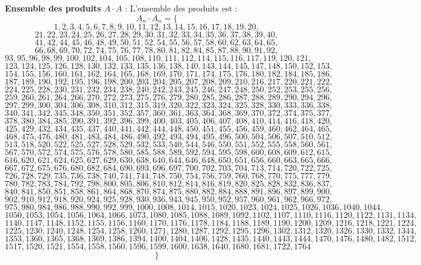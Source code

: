 \documentclass[11pt,a4paper]{article}
\begin{document}
\textbf{Ensemble des produits $A \cdot A$} :
L'ensemble des produits est :
$$ A_{{{n}}} \cdot A_{{{n}}} = \{ $$$$ 1, 2, 3, 4, 5, 6, 7, 8, 9, 10, 11, 12, 13, 14, 15, 16, 17, 18, 19, 20, $$$$ 21, 22, 23, 24, 25, 26, 27, 28, 29, 30, 31, 32, 33, 34, 35, 36, 37, 38, 39, 40, $$$$ 41, 42, 44, 45, 46, 48, 49, 50, 51, 52, 54, 55, 56, 57, 58, 60, 62, 63, 64, 65, $$$$ 66, 68, 69, 70, 72, 74, 75, 76, 77, 78, 80, 81, 82, 84, 85, 87, 88, 90, 91, 92, $$$$ 93, 95, 96, 98, 99, 100, 102, 104, 105, 108, 110, 111, 112, 114, 115, 116, 117, 119, 120, 121, $$$$ 123, 124, 125, 126, 128, 130, 132, 133, 135, 136, 138, 140, 143, 144, 145, 147, 148, 150, 152, 153, $$$$ 154, 155, 156, 160, 161, 162, 164, 165, 168, 169, 170, 171, 174, 175, 176, 180, 182, 184, 185, 186, $$$$ 187, 189, 190, 192, 195, 196, 198, 200, 203, 204, 205, 207, 208, 209, 210, 216, 217, 220, 221, 222, $$$$ 224, 225, 228, 230, 231, 232, 234, 238, 240, 242, 243, 245, 246, 247, 248, 250, 252, 253, 255, 256, $$$$ 259, 260, 261, 264, 266, 270, 272, 273, 275, 276, 279, 280, 285, 286, 287, 288, 289, 290, 294, 296, $$$$ 297, 299, 300, 304, 306, 308, 310, 312, 315, 319, 320, 322, 323, 324, 325, 328, 330, 333, 336, 338, $$$$ 340, 341, 342, 345, 348, 350, 351, 352, 357, 360, 361, 363, 364, 368, 369, 370, 372, 374, 375, 377, $$$$ 378, 380, 384, 385, 390, 391, 392, 396, 399, 400, 403, 405, 406, 407, 408, 410, 414, 416, 418, 420, $$$$ 425, 429, 432, 434, 435, 437, 440, 441, 442, 444, 448, 450, 451, 455, 456, 459, 460, 462, 464, 465, $$$$ 468, 475, 476, 480, 481, 483, 484, 486, 490, 492, 493, 494, 495, 496, 500, 504, 506, 507, 510, 512, $$$$ 513, 518, 520, 522, 525, 527, 528, 529, 532, 533, 540, 544, 546, 550, 551, 552, 555, 558, 560, 561, $$$$ 567, 570, 572, 574, 575, 576, 578, 580, 585, 588, 589, 592, 594, 595, 598, 600, 608, 609, 612, 615, $$$$ 616, 620, 621, 624, 625, 627, 629, 630, 638, 640, 644, 646, 648, 650, 651, 656, 660, 663, 665, 666, $$$$ 667, 672, 675, 676, 680, 682, 684, 690, 693, 696, 697, 700, 702, 703, 704, 713, 714, 720, 722, 725, $$$$ 726, 728, 729, 735, 736, 738, 740, 741, 744, 748, 750, 754, 756, 759, 760, 768, 770, 775, 777, 779, $$$$ 780, 782, 783, 784, 792, 798, 800, 805, 806, 810, 812, 814, 816, 819, 820, 825, 828, 832, 836, 837, $$$$ 840, 841, 850, 851, 858, 861, 864, 868, 870, 874, 875, 880, 882, 884, 888, 891, 896, 897, 899, 900, $$$$ 902, 910, 912, 918, 920, 924, 925, 928, 930, 936, 943, 945, 950, 952, 957, 960, 961, 962, 966, 972, $$$$ 975, 980, 984, 986, 988, 990, 992, 999, 1000, 1008, 1014, 1015, 1020, 1023, 1024, 1025, 1026, 1036, 1040, 1044, $$$$ 1050, 1053, 1054, 1056, 1064, 1066, 1073, 1080, 1085, 1088, 1089, 1092, 1102, 1107, 1110, 1116, 1120, 1122, 1131, 1134, $$$$ 1140, 1147, 1148, 1152, 1155, 1156, 1160, 1170, 1176, 1178, 1184, 1188, 1189, 1190, 1200, 1209, 1216, 1218, 1221, 1224, $$$$ 1225, 1230, 1240, 1248, 1254, 1258, 1260, 1271, 1280, 1287, 1292, 1295, 1296, 1302, 1312, 1320, 1326, 1330, 1332, 1344, $$$$ 1353, 1360, 1365, 1368, 1369, 1386, 1394, 1400, 1404, 1406, 1428, 1435, 1440, 1443, 1444, 1470, 1476, 1480, 1482, 1512, $$$$ 1517, 1520, 1521, 1554, 1558, 1560, 1596, 1599, 1600, 1638, 1640, 1680, 1681, 1722, 1764 $$$$ \} $$
\end{document}
